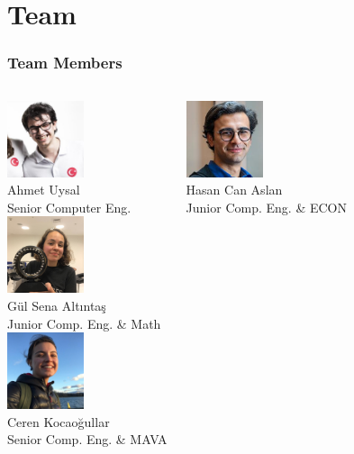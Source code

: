   \section{Team}
    \begin{frame}
      \frametitle{Team Members}
    
      \begin{columns}
				\column{5cm}
				\centering 
					\includegraphics[width=2.25cm]{images/ahmet.jpg}\\
					Ahmet Uysal\\
					Senior Computer Eng.\\

          \includegraphics[width=2.25cm]{images/gulsena.jpg}\\
					Gül Sena Altıntaş\\
					Junior Comp. Eng. \& Math\\
				\column{5cm}
				\centering
					\includegraphics[width=2.25cm]{images/ceren.jpg}\\
					Ceren Kocaoğullar\\
					Senior Comp. Eng. \& MAVA
          
          \includegraphics[width=2.25cm]{images/hasancan.jpg}\\
					Hasan Can Aslan\\
					Junior Comp. Eng. \& ECON
			\end{columns}
    
    \end{frame}


